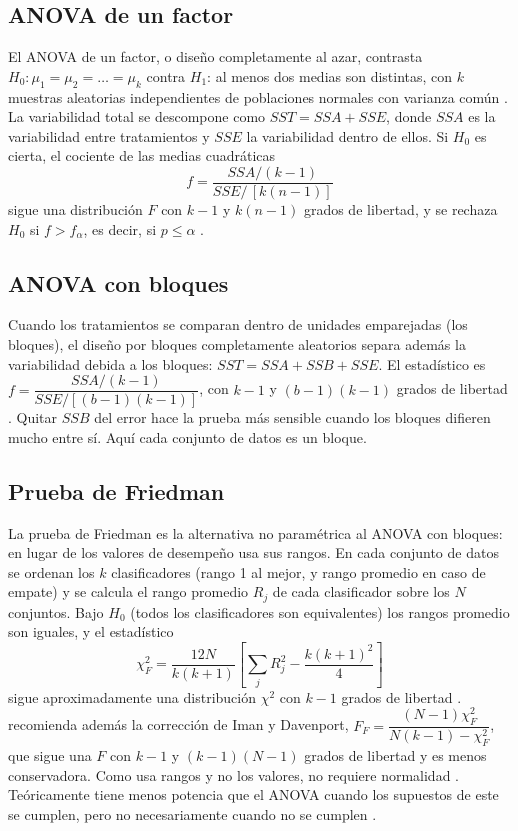 \documentclass[11pt,letterpaper]{article}
\begin{document}
\subsection{ANOVA de un factor}

El ANOVA de un factor, o diseño completamente al azar, contrasta $H_0\colon \mu_1 = \mu_2 = \dots = \mu_k$ contra $H_1$: al menos dos medias son distintas, con $k$ muestras aleatorias independientes de poblaciones normales con varianza común \parencite[sec.~13.3]{walpole2007}. La variabilidad total se descompone como $SST = SSA + SSE$, donde $SSA$ es la variabilidad entre tratamientos y $SSE$ la variabilidad dentro de ellos. Si $H_0$ es cierta, el cociente de las medias cuadráticas
\[
f = \frac{SSA/(k-1)}{SSE/\,[k(n-1)]}
\]
sigue una distribución $F$ con $k-1$ y $k(n-1)$ grados de libertad, y se rechaza $H_0$ si $f > f_\alpha$, es decir, si $p \le \alpha$ \parencite[sec.~13.3]{walpole2007}.

\subsection{ANOVA con bloques}

Cuando los tratamientos se comparan dentro de unidades emparejadas (los bloques), el diseño por bloques completamente aleatorios separa además la variabilidad debida a los bloques: $SST = SSA + SSB + SSE$. El estadístico es $f = \dfrac{SSA/(k-1)}{SSE/[(b-1)(k-1)]}$, con $k-1$ y $(b-1)(k-1)$ grados de libertad \parencite[sec.~13.9]{walpole2007}. Quitar $SSB$ del error hace la prueba más sensible cuando los bloques difieren mucho entre sí. Aquí cada conjunto de datos es un bloque.

\subsection{Prueba de Friedman}

La prueba de Friedman es la alternativa no paramétrica al ANOVA con bloques: en lugar de los valores de desempeño usa sus rangos. En cada conjunto de datos se ordenan los $k$ clasificadores (rango 1 al mejor, y rango promedio en caso de empate) y se calcula el rango promedio $R_j$ de cada clasificador sobre los $N$ conjuntos. Bajo $H_0$ (todos los clasificadores son equivalentes) los rangos promedio son iguales, y el estadístico
\[
\chi^2_F = \frac{12N}{k(k+1)}\left[\sum_j R_j^2 - \frac{k(k+1)^2}{4}\right]
\]
sigue aproximadamente una distribución $\chi^2$ con $k-1$ grados de libertad \parencite{demsar2006}. \textcite{demsar2006} recomienda además la corrección de Iman y Davenport, $F_F = \dfrac{(N-1)\chi^2_F}{N(k-1)-\chi^2_F}$, que sigue una $F$ con $k-1$ y $(k-1)(N-1)$ grados de libertad y es menos conservadora. Como usa rangos y no los valores, no requiere normalidad \parencite{tecnm2026_tema32}. Teóricamente tiene menos potencia que el ANOVA cuando los supuestos de este se cumplen, pero no necesariamente cuando no se cumplen \parencite{demsar2006}.
\end{document}
